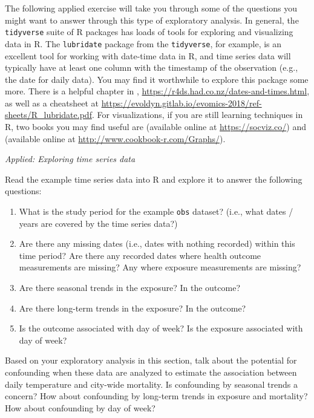 \documentclass[
]{book}
\providecommand{\tightlist}{%
  \setlength{\itemsep}{0pt}\setlength{\parskip}{0pt}}
\begin{document}
The following applied exercise will take you through some of the
questions you might want to answer through this type of exploratory analysis.
In
general, the \texttt{tidyverse} suite of R packages has loads of tools for exploring and
visualizing data in R.
The \texttt{lubridate} package from the \texttt{tidyverse}, for example, is an excellent tool for working with date-time data
in R, and time series data will typically have at least one column with the
timestamp of the observation (e.g., the date for daily data).
You may find it worthwhile to explore this package some more. There is a helpful
chapter in \citet{wickham2016r}, \url{https://r4ds.had.co.nz/dates-and-times.html}, as well
as a cheatsheet at
\url{https://evoldyn.gitlab.io/evomics-2018/ref-sheets/R_lubridate.pdf}. For
visualizations, if you are still learning techniques in R, two books
you may find useful are
\citet{healy2018data} (available online at \url{https://socviz.co/}) and \citet{chang2018r}
(available online at \url{http://www.cookbook-r.com/Graphs/}).

\emph{Applied: Exploring time series data}

Read the example time series data into R and explore it to answer the following
questions:

\begin{enumerate}
\def\labelenumi{\arabic{enumi}.}
\tightlist
\item
  What is the study period for the example \texttt{obs} dataset? (i.e., what
  dates / years are covered by the time series data?)
\item
  Are there any missing dates (i.e., dates with nothing recorded) within this time
  period? Are there any recorded dates where health outcome measurements are missing?
  Any where exposure measurements are missing?
\item
  Are there seasonal trends in the exposure? In the outcome?
\item
  Are there long-term trends in the exposure? In the outcome?
\item
  Is the outcome associated with day of week? Is the exposure associated
  with day of week?
\end{enumerate}

Based on your exploratory analysis in this section, talk about the potential
for confounding when these data are analyzed to estimate the association between
daily temperature and city-wide mortality. Is confounding by seasonal trends
a concern? How about confounding by long-term trends in exposure and mortality?
How about confounding by day of week?
\end{document}
